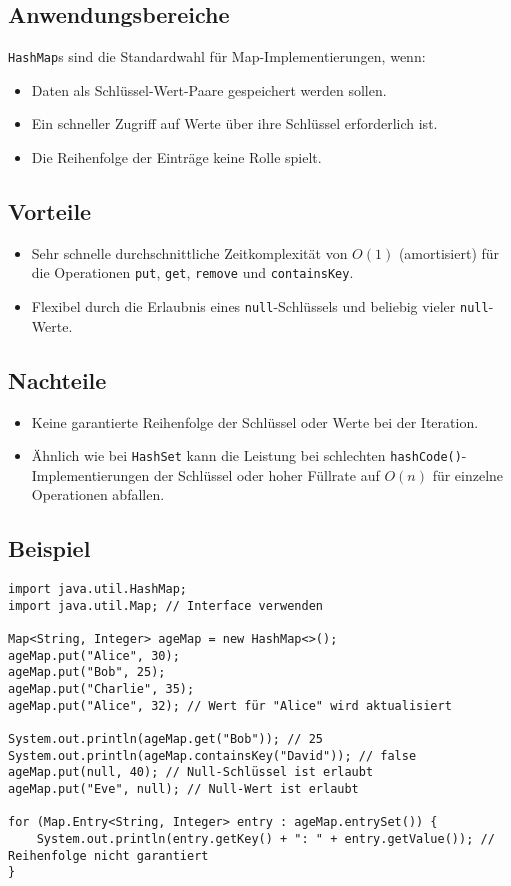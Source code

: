 \subsection{Anwendungsbereiche}
\texttt{HashMap}s sind die Standardwahl für Map-Implementierungen, wenn:
\begin{itemize}
    \item Daten als Schlüssel-Wert-Paare gespeichert werden sollen.
    \item Ein schneller Zugriff auf Werte über ihre Schlüssel erforderlich ist.
    \item Die Reihenfolge der Einträge keine Rolle spielt.
\end{itemize}

\subsection{Vorteile}
\begin{itemize}
    \item Sehr schnelle durchschnittliche Zeitkomplexität von $O(1)$ (amortisiert) für
          die Operationen \texttt{put}, \texttt{get}, \texttt{remove} und
          \texttt{containsKey}.
    \item Flexibel durch die Erlaubnis eines \texttt{null}-Schlüssels und beliebig vieler
          \texttt{null}-Werte.
\end{itemize}

\subsection{Nachteile}
\begin{itemize}
    \item Keine garantierte Reihenfolge der Schlüssel oder Werte bei der Iteration.
    \item Ähnlich wie bei \texttt{HashSet} kann die Leistung bei schlechten \texttt{hashCode()}-Implementierungen der Schlüssel oder hoher Füllrate auf $O(n)$ für einzelne Operationen abfallen.
\end{itemize}

\subsection{Beispiel}
\begin{lstlisting}[caption={Beispiel für die Verwendung einer HashMap in Java}, label=lst:hashMapExample]
import java.util.HashMap;
import java.util.Map; // Interface verwenden

Map<String, Integer> ageMap = new HashMap<>();
ageMap.put("Alice", 30);
ageMap.put("Bob", 25);
ageMap.put("Charlie", 35);
ageMap.put("Alice", 32); // Wert für "Alice" wird aktualisiert

System.out.println(ageMap.get("Bob")); // 25
System.out.println(ageMap.containsKey("David")); // false
ageMap.put(null, 40); // Null-Schlüssel ist erlaubt
ageMap.put("Eve", null); // Null-Wert ist erlaubt

for (Map.Entry<String, Integer> entry : ageMap.entrySet()) {
    System.out.println(entry.getKey() + ": " + entry.getValue()); // Reihenfolge nicht garantiert
}
\end{lstlisting}

